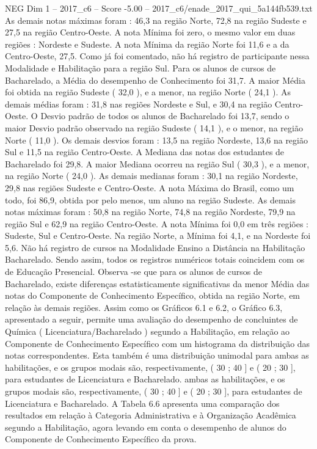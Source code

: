 \begin{textsample}{NEG Dim 1 – 2017\_c6 – Score -5.00 – 2017\_c6/enade\_2017\_qui\_5a144fb539.txt}
As demais notas máximas foram : 46,3 na região Norte, 72,8 na região Sudeste e 27,5 na região Centro-Oeste.
A nota Mínima foi zero, o mesmo valor em duas regiões : Nordeste e Sudeste.
A nota Mínima da região Norte foi 11,6 e a da Centro-Oeste, 27,5.
Como já foi comentado, não há registro de participante nessa Modalidade e Habilitação para a região Sul.
Para os alunos de cursos de Bacharelado, a Média do desempenho de Conhecimento foi 31,7.
A maior Média foi obtida na região Sudeste ( 32,0 ), e a menor, na região Norte ( 24,1 ).
As demais médias foram : 31,8 nas regiões Nordeste e Sul, e 30,4 na região Centro-Oeste.
O Desvio padrão de todos os alunos de Bacharelado foi 13,7, sendo o maior Desvio padrão observado na região Sudeste ( 14,1 ), e o menor, na região Norte ( 11,0 ).
Os demais desvios foram : 13,5 na região Nordeste, 13,6 na região Sul e 11,5 na região Centro-Oeste.
A Mediana das notas dos estudantes de Bacharelado foi 29,8.
A maior Mediana ocorreu na região Sul ( 30,3 ), e a menor, na região Norte ( 24,0 ).
As demais medianas foram : 30,1 na região Nordeste, 29,8 nas regiões Sudeste e Centro-Oeste.
A nota Máxima do Brasil, como um todo, foi 86,9, obtida por pelo menos, um aluno na região Sudeste.
As demais notas máximas foram : 50,8 na região Norte, 74,8 na região Nordeste, 79,9 na região Sul e 62,9 na região Centro-Oeste.
A nota Mínima foi 0,0 em três regiões : Sudeste, Sul e Centro-Oeste.
Na região Norte, a Mínima foi 4,1, e na Nordeste foi 5,6.
Não há registro de cursos na Modalidade Ensino a Distância na Habilitação Bacharelado.
Sendo assim, todos os registros numéricos totais coincidem com os de Educação Presencial.
Observa -se que para os alunos de cursos de Bacharelado, existe diferenças estatisticamente significativas da menor Média das notas do Componente de Conhecimento Específico, obtida na região Norte, em relação às demais regiões.
Assim como os Gráficos 6.1 e 6.2, o Gráfico 6.3, apresentado a seguir, permite uma avaliação do desempenho de concluintes de Química ( Licenciatura/Bacharelado ) segundo a Habilitação, em relação ao Componente de Conhecimento Específico com um histograma da distribuição das notas correspondentes.
Esta também é uma distribuição unimodal para ambas as habilitações, e os grupos modais são, respectivamente, ( 30 ; 40 ] e ( 20 ; 30 ], para estudantes de Licenciatura e Bacharelado. ambas as habilitações, e os grupos modais são, respectivamente, ( 30 ; 40 ] e ( 20 ; 30 ], para estudantes de Licenciatura e Bacharelado.
A Tabela 6.6 apresenta uma comparação dos resultados em relação à Categoria Administrativa e à Organização Acadêmica segundo a Habilitação, agora levando em conta o desempenho de alunos do Componente de Conhecimento Específico da prova.

\end{textsample}
